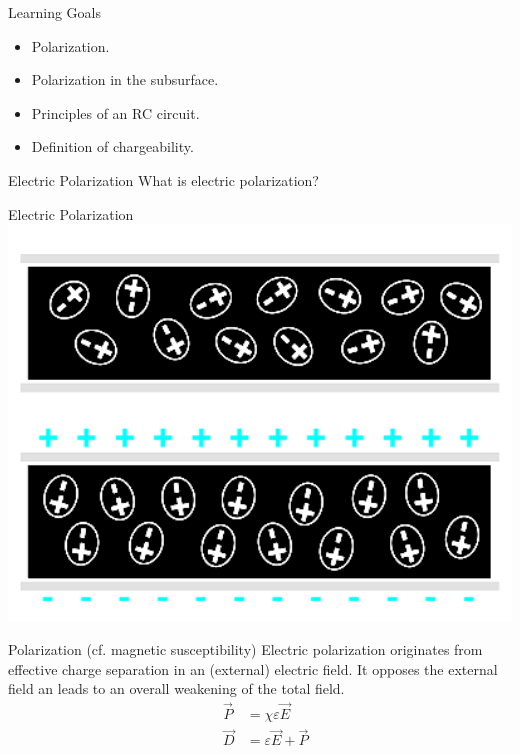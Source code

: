 \begin{frame}
  \begin{PointSix}{Learning Goals}
    \begin{itemize}
      \item \alert{Polarization.}
      \item \alert{Polarization in the subsurface.}
      \item \alert{Principles of an RC circuit.}
      \item \alert{Definition of chargeability.}
    \end{itemize}
  \end{PointSix}
\end{frame}

\begin{frame}
  \begin{PointSix}{Electric Polarization}
    What is electric polarization?
  \end{PointSix}
\end{frame}

\begin{frame}
  \begin{PointSix}{Electric Polarization}
    \includegraphics[width=1.0\textwidth]{Figures/InducedPolarization/diel.png}
  \end{PointSix}
\end{frame}

\begin{frame}
  \begin{PointSix}{Polarization (cf. magnetic susceptibility)}
  \small Electric polarization originates from effective charge separation in an (external) electric field. It opposes the external field an leads to an overall weakening of the total field.
    \begin{eqnarray}
      &\vec{P}& = \chi \varepsilon \vec{E} \\
      &\vec{D}& = \varepsilon \vec{E} + \vec{P}
    \end{eqnarray}
  \end{PointSix}
\end{frame}

